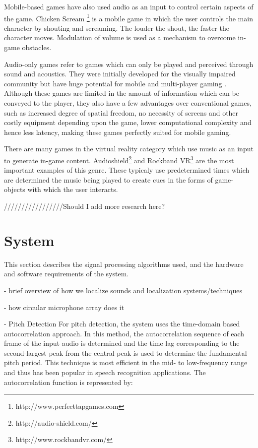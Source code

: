 \documentclass[convention]{aesconf}
\begin{document}
Mobile-based games have also used audio as an input to control certain aspects of the game. Chicken Scream \footnote{http://www.perfecttapgames.com} is a mobile game in which the user controls the main character by shouting and screaming. The louder the shout, the faster the character moves. Modulation of volume is used as a mechanism to overcome in-game obstacles.

Audio-only games refer to games which can only be played and perceived through sound and acoustics. They were initially developed for the visually impaired community but have huge potential for mobile and multi-player gaming \cite{rober2005playing}. Although these games are limited in the amount of information which can be conveyed to the player, they also have a few advantages over conventional games, such as increased degree of spatial freedom, no necessity of screens and other costly equipment depending upon the game, lower computational complexity and hence less latency, making these games perfectly suited for mobile gaming.

There are many games in the virtual reality category which use music as an input to generate in-game content. Audioshield\footnote{http://audio-shield.com/} and Rockband VR\footnote{http://www.rockbandvr.com/} are the most important examples of this genre. These typicaly use predetermined times which are determined the  music being played to create cues in the forms of game-objects with which the user interacts.

/////////////////Should I add more research here? \cite{Igarashi:2001:VSU:502348.502372}

\section{System}  
This section describes the signal processing algorithms used, and the hardware and software requirements of the system.

- brief overview of how we localize sounds and localization systems/techniques

- how circular microphone array does it

- Pitch Detection
For pitch detection, the system uses the time-domain based autocorrelation approach. In this method, the autocorrelation sequence of each frame of the input audio is determined and the time lag corresponding to the second-largest peak from the central peak is used to determine the fundamental pitch period. This technique is most efficient in the mid- to low-frequency range and thus has been popular in speech recognition applications. The autocorrelation function is represented by: 
\end{document}

